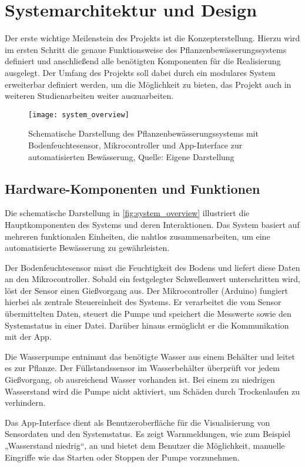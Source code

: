 \chapter{Systemarchitektur und Design}

Der erste wichtige Meilenstein des Projekts ist die Konzepterstellung. Hierzu wird im ersten Schritt die genaue Funktionsweise des Pflanzenbewässerungssystems definiert und anschließend alle benötigten Komponenten für die Realisierung ausgelegt. Der Umfang des Projekts soll dabei durch ein modulares System erweiterbar definiert werden, um die Möglichkeit zu bieten, das Projekt auch in weiteren Studienarbeiten weiter auszuarbeiten.

\begin{figure}[h]
	\centering
	\texttt{[image: system\_overview]}
	\caption{Schematische Darstellung des Pflanzenbewässerungssystems mit Bodenfeuchtesensor, Mikrocontroller und App-Interface zur automatisierten Bewässerung, Quelle: Eigene Darstellung}
	\label{fig:system_overview}
\end{figure}

\section{Hardware-Komponenten und Funktionen}
Die schematische Darstellung in \autoref{fig:system_overview} illustriert die Hauptkomponenten des Systems und deren Interaktionen. Das System basiert auf mehreren funktionalen Einheiten, die nahtlos zusammenarbeiten, um eine automatisierte Bewässerung zu gewährleisten. 

Der Bodenfeuchtesensor misst die Feuchtigkeit des Bodens und liefert diese Daten an den Mikrocontroller. Sobald ein festgelegter Schwellenwert unterschritten wird, löst der Sensor einen Gießvorgang aus. Der Mikrocontroller (Arduino) fungiert hierbei als zentrale Steuereinheit des Systems. Er verarbeitet die vom Sensor übermittelten Daten, steuert die Pumpe und speichert die Messwerte sowie den Systemstatus in einer Datei. Darüber hinaus ermöglicht er die Kommunikation mit der App.

Die Wasserpumpe entnimmt das benötigte Wasser aus einem Behälter und leitet es zur Pflanze. Der Füllstandssensor im Wasserbehälter überprüft vor jedem Gießvorgang, ob ausreichend Wasser vorhanden ist. Bei einem zu niedrigen Wasserstand wird die Pumpe nicht aktiviert, um Schäden durch Trockenlaufen zu verhindern. 

Das App-Interface dient als Benutzeroberfläche für die Visualisierung von Sensordaten und den Systemstatus. Es zeigt Warnmeldungen, wie zum Beispiel „Wasserstand niedrig“, an und bietet dem Benutzer die Möglichkeit, manuelle Eingriffe wie das Starten oder Stoppen der Pumpe vorzunehmen. 

